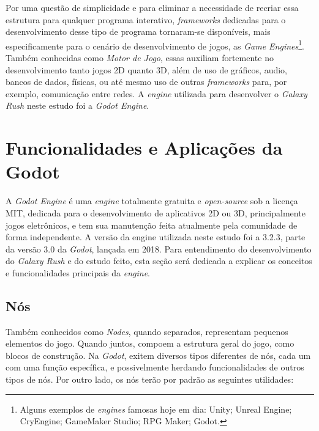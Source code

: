 Por uma questão de simplicidade e para eliminar a necessidade de recriar essa estrutura para qualquer programa interativo, \textit{frameworks} dedicadas para o desenvolvimento desse tipo de programa tornaram-se disponíveis, mais especificamente para o cenário de desenvolvimento de jogos, as \textit{Game Engines}\footnote{
    Alguns exemplos de \textit{engines} famosas hoje em dia: Unity; Unreal Engine; CryEngine; GameMaker Studio; RPG Maker; Godot.
}. Também conhecidas como \textit{Motor de Jogo}, essas auxiliam fortemente no desenvolvimento tanto jogos 2D quanto 3D, além de uso de gráficos, audio, bancos de dados, físicas, ou até mesmo uso de outras \textit{frameworks} para, por exemplo, comunicação entre redes. A \textit{engine} utilizada para desenvolver o \textit{Galaxy Rush} neste estudo foi a \textit{Godot Engine}.

\section{Funcionalidades e Aplicações da Godot}

A \textit{Godot Engine} é uma \textit{engine} totalmente gratuita e \textit{open-source} sob a licença MIT, dedicada para o desenvolvimento de aplicativos 2D ou 3D, principalmente jogos eletrônicos, e tem sua manutenção feita atualmente pela comunidade de forma independente. A versão da engine utilizada neste estudo foi a 3.2.3, parte da versão 3.0 da \textit{Godot}, lançada em 2018. Para entendimento do desenvolvimento do \textit{Galaxy Rush} e do estudo feito, esta seção será dedicada a explicar os conceitos e funcionalidades principais da \textit{engine}.

\subsection{Nós}

Também conhecidos como \textit{Nodes}, quando separados, representam pequenos elementos do jogo. Quando juntos, compoem a estrutura geral do jogo, como blocos de construção. Na \textit{Godot}, exitem diversos tipos diferentes de nós, cada um com uma função específica, e possivelmente herdando funcionalidades de outros tipos de nós. Por outro lado, os nós terão por padrão as seguintes utilidades:

